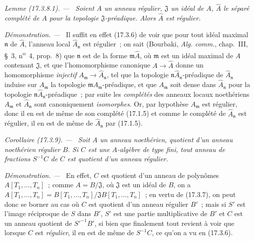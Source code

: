 \documentclass[10pt,oneside]{book}
\makeatletter
\newcommand{\setmanualcurrentlabel}[1]{\def\@currentlabel{#1}}
\newcommand{\oldpage}[2][]{%
  \setcounter{footnote}{0}%
  \marginpar{\scriptsize\textbf{#1}~|~#2}\ignorespaces}
\newenvironment{corollary}[1][]{%
  \setmanualcurrentlabel{#1}\par\medskip\noindent\itshape Corollaire (#1). ---\ }{\par}
\newenvironment{lemma}[1][]{%
  \setmanualcurrentlabel{#1}\par\medskip\noindent\itshape Lemme (#1). ---\ }{\par}
\newenvironment{proof}{%
  \par\medskip\noindent\textit{Démonstration. ---\ }}{\par}
\makeatother
\begin{document}
\begin{lemma}[17.3.8.1]
\label{0.17.3.8.1-fr}
Soient $A$ un anneau régulier, $\mathfrak{J}$ un idéal de $A$,
$\widehat{A}$ le séparé complété de $A$ pour la topologie
$\mathfrak{J}$-préadique. Alors $\widehat{A}$ est régulier.
\end{lemma}

\begin{proof}
Il suffit en effet (17.3.6) de voir que pour tout idéal maximal
$\mathfrak{n}$ de $\widehat{A}$, l'anneau local
$\widehat{A}_{\mathfrak{n}}$ est régulier~; on sait (Bourbaki,
\emph{Alg. comm.}, chap.~III, \S~3, n\textsuperscript{o}~4, prop.~8) que
$\mathfrak{n}$
\oldpage[0\textsubscript{IV-1}]{51}
est de la forme $\mathfrak{m}\widehat{A}$, où $\mathfrak{m}$ est un idéal
maximal de $A$ contenant $\mathfrak{J}$, et que l'homomorphisme canonique
$A\to\widehat{A}$ donne un homomorphisme \emph{injectif}
$A_{\mathfrak{m}}\to\widehat{A}_{\mathfrak{n}}$, tel que la topologie
$\mathfrak{n}\widehat{A}_{\mathfrak{n}}$-préadique de
$\widehat{A}_{\mathfrak{n}}$ induise sur $A_{\mathfrak{m}}$ la topologie
$\mathfrak{m}A_{\mathfrak{m}}$-préadique, et que $A_{\mathfrak{m}}$ soit
dense dans $\widehat{A}_{\mathfrak{n}}$ pour la topologie
$\mathfrak{n}\widehat{A}_{\mathfrak{n}}$-préadique~; par suite les
\emph{complétés} des anneaux locaux noethériens $A_{\mathfrak{m}}$ et
$\widehat{A}_{\mathfrak{n}}$ sont canoniquement \emph{isomorphes}. Or, par
hypothèse $A_{\mathfrak{m}}$ est régulier, donc il en est de même de son
complété (17.1.5) et comme le complété de $\widehat{A}_{\mathfrak{n}}$ est
régulier, il en est de même de $\widehat{A}_{\mathfrak{n}}$ par (17.1.5).
\end{proof}

\begin{corollary}[17.3.9]
\label{0.17.3.9-fr}
Soit $A$ un anneau noethérien, quotient d'un anneau noethérien régulier $B$.
Si $C$ est une $A$-algèbre de type fini, tout anneau de fractions $S^{-1}C$
de $C$ est quotient d'un anneau régulier.
\end{corollary}

\begin{proof}
En effet, $C$ est quotient d'un anneau de polynômes $A[T_1,\ldots,T_n]$~;
comme $A=B/\mathfrak{J}$, où $\mathfrak{J}$ est un idéal de $B$, on a
$A[T_1,\ldots,T_n]=B[T_1,\ldots,T_n]/\mathfrak{J}B[T_1,\ldots,T_n]$~; en
vertu de (17.3.7), on peut donc se borner au cas où $C$ est quotient d'un
anneau régulier $B'$~; mais si $S'$ est l'image réciproque de $S$ dans $B'$,
$S'$ est une partie multiplicative de $B'$ et $C$ est un anneau quotient de
$S'^{-1}B'$, si bien que finalement tout revient à voir que lorsque $C$ est
\emph{régulier}, il en est de même de $S^{-1}C$, ce qu'on a vu en (17.3.6).
\end{proof}
\end{document}
